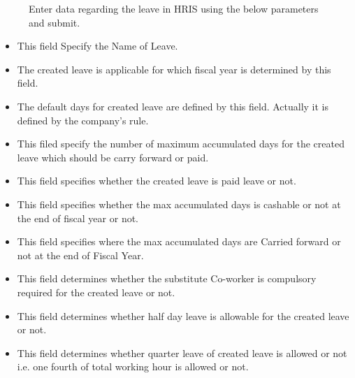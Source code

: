 \documentclass[letterpaper,10pt,english]{sphinxmanual}
\begin{document}
\begin{figure}[htbp]
\centering
\capstart

\noindent{}
\caption{Enter data regarding the leave in HRIS using the below parameters and submit.}\label{\detokenize{leave-holiday/leave-configuration:id2}}\end{figure}
\begin{itemize}
\item {} 
 This field Specify the Name of Leave.

\item {} 
 The created leave is applicable for which fiscal year is determined by this field.

\item {} 
 The default days for created leave are defined by this field. Actually it is defined by the company’s rule.

\item {} 
 This filed specify the number of maximum accumulated days for the created leave which  should be carry forward or paid.

\item {} 
 This field specifies whether the created leave is paid leave or not.

\item {} 
 This field specifies whether the max accumulated days is cashable or not at the end of fiscal year or not.

\item {} 
 This field specifies where the max accumulated days are Carried forward or not at the end of Fiscal Year.

\item {} 
 This field determines whether the substitute Co-worker is compulsory required for the created leave or not.

\item {} 
 This field determines whether half day leave is allowable for the created leave or not.

\item {} 
  This field determines whether quarter leave of created leave is allowed or not i.e. one fourth of total working hour is allowed or not.


\end{itemize}
\end{document}
